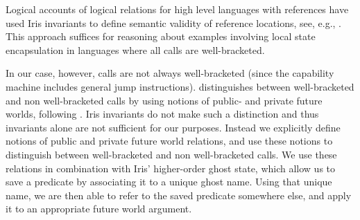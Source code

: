 \documentclass[sigplan,review]{acmart}\settopmatter{printfolios=true,printccs=false,printacmref=false}
\begin{document}




Logical accounts of logical relations for high level languages with references have used Iris invariants to define semantic validity of reference locations, see, e.g., \cite{ipm}.
This approach suffices for reasoning about examples involving local state encapsulation in languages where all calls are well-bracketed.

In our case, however, calls are not always well-bracketed (since the capability machine includes general jump instructions).
\citeauthor{skorstengaardESOP18} distinguishes between well-bracketed and non well-bracketed calls by using notions of public- and private future worlds, following \cite{dreyer_neis_birkedal_2012}.
Iris invariants do not make such a distinction and thus invariants alone are not sufficient for our purposes.
Instead we explicitly define notions of public and private future world relations, and use these notions to distinguish between well-bracketed and non well-bracketed calls.
We use these relations in combination with Iris' higher-order ghost state, which allow us to save a predicate by associating it to a unique ghost name.
Using that unique name, we are then able to refer to the saved predicate somewhere else, and apply it to
an appropriate future world argument.
\end{document}
